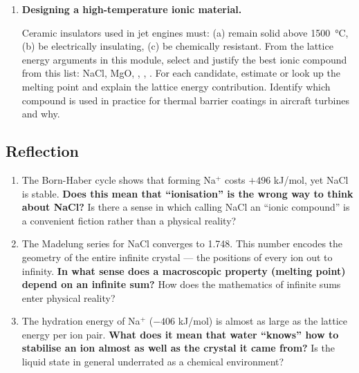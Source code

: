 \documentclass[12pt, a4paper]{book}
\begin{document}
\begin{deepbox}
\begin{enumerate}[label=\textbf{D\arabic*.}]
  \item \textbf{Designing a high-temperature ionic material.}

    Ceramic insulators used in jet engines must:
    (a) remain solid above \SI{1500}{\degreeCelsius},
    (b) be electrically insulating,
    (c) be chemically resistant.
    From the lattice energy arguments in this module,
    select and justify the best ionic compound from this list:
    NaCl, MgO, , , .
    For each candidate, estimate or look up the melting point
    and explain the lattice energy contribution.
    Identify which compound is used in practice for thermal
    barrier coatings in aircraft turbines and why.

\end{enumerate}
\end{deepbox}

\subsection*{Reflection}

\begin{reflectionbox}
\begin{enumerate}[label=\textbf{R\arabic*.}]
  \item The Born-Haber cycle shows that forming Na$^+$ costs
    $+496$ kJ/mol, yet NaCl is stable.
    \textbf{Does this mean that ``ionisation'' is the wrong
    way to think about NaCl?}
    Is there a sense in which calling NaCl an ``ionic compound''
    is a convenient fiction rather than a physical reality?

  \item The Madelung series for NaCl converges to 1.748.
    This number encodes the geometry of the entire infinite
    crystal --- the positions of every ion out to infinity.
    \textbf{In what sense does a macroscopic property (melting point)
    depend on an infinite sum?}
    How does the mathematics of infinite sums enter physical reality?

  \item The hydration energy of Na$^+$ ($-406$ kJ/mol) is
    almost as large as the lattice energy per ion pair.
    \textbf{What does it mean that water ``knows''
    how to stabilise an ion almost as well as the crystal it came from?}
    Is the liquid state in general underrated as a chemical environment?
\end{enumerate}
\end{reflectionbox}
\end{document}
